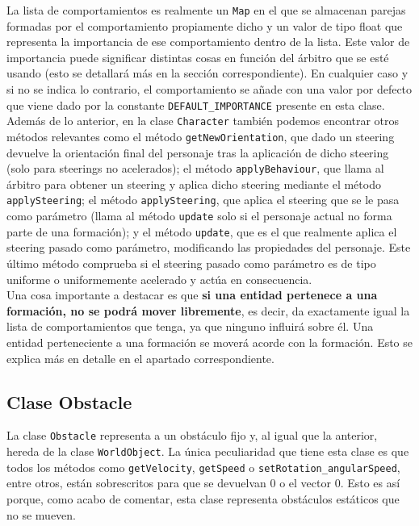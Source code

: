 La lista de comportamientos es realmente un \texttt{Map} en el que se almacenan parejas formadas por el comportamiento propiamente dicho y un valor de tipo float que representa la importancia de ese comportamiento dentro de la lista. Este valor de importancia puede significar distintas cosas en función del árbitro que se esté usando (esto se detallará más en la sección correspondiente). En cualquier caso y si no se indica lo contrario, el comportamiento se añade con una valor por defecto que viene dado por la constante \texttt{DEFAULT\_IMPORTANCE} presente en esta clase. \\

Además de lo anterior, en la clase \texttt{Character} también podemos encontrar otros métodos relevantes como el método \texttt{getNewOrientation}, que dado un steering devuelve la orientación final del personaje tras la aplicación de dicho steering (solo para steerings no acelerados); el método \texttt{applyBehaviour}, que llama al árbitro para obtener un steering y aplica dicho steering mediante el método \texttt{applySteering}; el método \texttt{applySteering}, que aplica el steering que se le pasa como parámetro (llama al método \texttt{update} solo si el personaje actual no forma parte de una formación); y el método \texttt{update}, que es el que realmente aplica el steering pasado como parámetro, modificando las propiedades del personaje. Este último método comprueba si el steering pasado como parámetro es de tipo uniforme o uniformemente acelerado y actúa en consecuencia. \\

Una cosa importante a destacar es que \textbf{si una entidad pertenece a una formación, no se podrá mover libremente}, es decir, da exactamente igual la lista de comportamientos que tenga, ya que ninguno influirá sobre él. Una entidad perteneciente a una formación se moverá acorde con la formación. Esto se explica más en detalle en el apartado correspondiente.

\subsection{Clase Obstacle}

La clase \texttt{Obstacle} representa a un obstáculo fijo y, al igual que la anterior, hereda de la clase \texttt{WorldObject}. La única peculiaridad que tiene esta clase es que todos los métodos como \texttt{getVelocity}, \texttt{getSpeed} o \texttt{setRotation\_angularSpeed}, entre otros, están sobrescritos para que se devuelvan 0 o el vector 0. Esto es así porque, como acabo de comentar, esta clase representa obstáculos estáticos que no se mueven.

